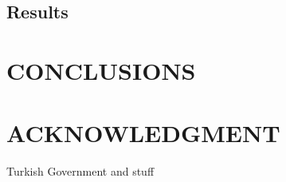 \documentclass[conference]{IEEEtran}
\begin{document}
    \subsection{Results}



  \section{\label{sec-CO}CONCLUSIONS}

  \section*{ACKNOWLEDGMENT}
  Turkish Government and stuff

  
  


%
%

\end{document}
